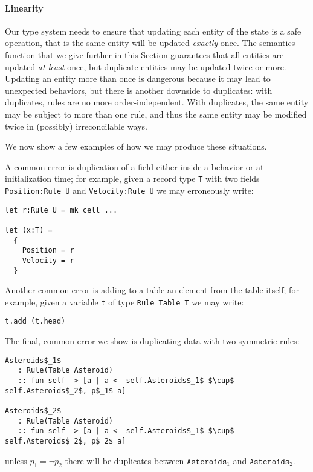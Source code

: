 \paragraph{Linearity}

Our type system needs to ensure that updating each entity of the state is a safe operation, that is the same entity will be updated \textit{exactly} once. The semantics function that we give further in this Section guarantees that all entities are updated \textit{at least} once, but duplicate entities may be updated twice or more. Updating an entity more than once is dangerous because it may lead to unexpected behaviors, but there is another downside to duplicates: with duplicates, rules are no more order-independent. With duplicates, the same entity may be subject to more than one rule, and thus the same entity may be modified twice in (possibly) irreconcilable ways.

We now show a few examples of how we may produce these situations.

A common error is duplication of a field either inside a behavior or at initialization time; for example, given a record type \texttt{T} with two fields \texttt{Position:Rule U} and \texttt{Velocity:Rule U} we may erroneously write:

\begin{lstlisting}
let r:Rule U = mk_cell ...

let (x:T) = 
  {
    Position = r
    Velocity = r
  }
\end{lstlisting}

Another common error is adding to a table an element from the table itself; for example, given a variable \texttt{t} of type \texttt{Rule Table T} we may write:

\begin{lstlisting}
t.add (t.head)
\end{lstlisting}

The final, common error we show is duplicating data with two symmetric rules:

\begin{lstlisting}
Asteroids$_1$
   : Rule(Table Asteroid) 
   :: fun self -> [a | a <- self.Asteroids$_1$ $\cup$ self.Asteroids$_2$, p$_1$ a]

Asteroids$_2$
   : Rule(Table Asteroid) 
   :: fun self -> [a | a <- self.Asteroids$_1$ $\cup$ self.Asteroids$_2$, p$_2$ a]
\end{lstlisting}

unless $p_1 = \neg p_2$ there will be duplicates between $\mathtt{Asteroids}_1$ and $\mathtt{Asteroids}_2$.

